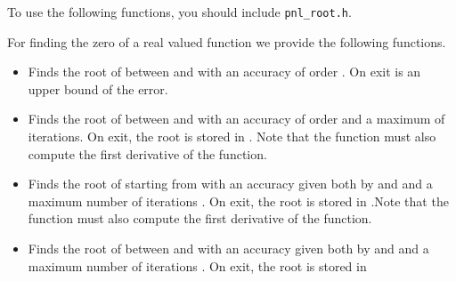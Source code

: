 To use the following functions, you should include \verb!pnl_root.h!.

For finding the zero of a real valued function we provide the following
functions.
\begin{itemize}
  \item {}
    \sshortdescribe Finds the root of  between  and  with
    an accuracy of order . On exit  is an upper bound of the
    error.

  \item {}
    \sshortdescribe Finds the root of  between  and  with
    an accuracy of order  and a maximum of  iterations. On
    exit, the root is stored in . Note that the function  must
    also compute the first derivative of the function.


  \item {}
    \sshortdescribe Finds the root of  starting from  with an
    accuracy given both by  and  and a maximum number of
    iterations . On exit, the root is stored in .Note that
    the function  must also compute the first derivative of the function.

  \item {}
    \sshortdescribe Finds the root of  between  and  with
    an accuracy given both by  and  and a maximum number
    of iterations . On exit, the root is stored in 
\end{itemize}

